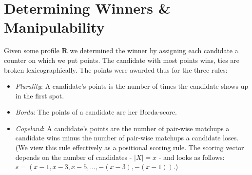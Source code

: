 \documentclass[10pt,a4paper]{article}
\begin{document}
	\section{Determining Winners \& Manipulability}
	Given some profile $\mathbf{R}$ we determined the winner by assigning each candidate a counter on which we put points. The candidate with most points wins, ties are broken lexicographically. The points were awarded thus for the three rules:
	\begin{itemize}
		\item \textit{Plurality}: A candidate's points is the number of times the candidate shows up in the first spot.
		\item \textit{Borda}: The points of a candidate are her Borda-score.
		\item \textit{Copeland}: A candidate's points are the number of pair-wise matchups a candidate wins minus the number of pair-wise matchups a candidate loses. (We view this rule effectively as a positional scoring rule. The scoring vector depends on the number of candidates - $|X|=x$ - and looks as follows: $s=(x-1, x-3, x-5, ..., -(x-3), -(x-1))$.)
	\end{itemize}
	
\end{document}
